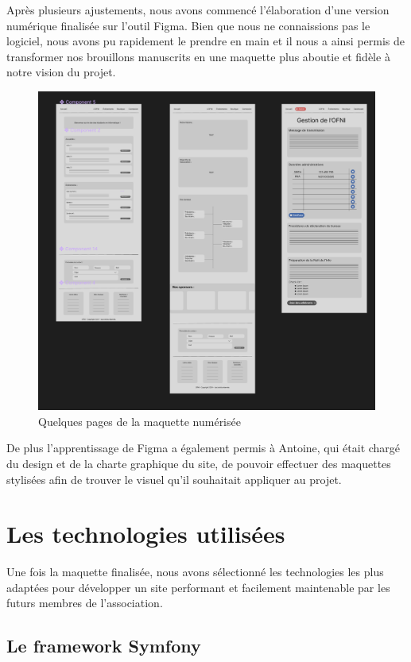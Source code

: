 Après plusieurs ajustements, nous 
avons commencé l'élaboration d'une version numérique finalisée sur l'outil Figma.
Bien que nous ne connaissions pas le logiciel, nous avons pu rapidement le prendre en main et il nous a ainsi permis de transformer nos brouillons manuscrits en une maquette plus aboutie et fidèle à notre vision du projet.

\begin{figure}[H]
    \centering
    \includegraphics[scale=0.4]{assets/pictures/figma.png}
    \caption{Quelques pages de la maquette numérisée}
    \label{fig:enter-label}
\end{figure}

De plus l'apprentissage de Figma a également permis à Antoine, qui était chargé du design et de la charte graphique du site, de pouvoir effectuer des maquettes stylisées afin de trouver le visuel qu'il souhaitait appliquer au projet.

\section{Les technologies utilisées}

Une fois la maquette finalisée, nous avons sélectionné les technologies les plus adaptées pour développer un site performant et facilement maintenable par les futurs membres de l’association.

\subsection{Le framework Symfony}


